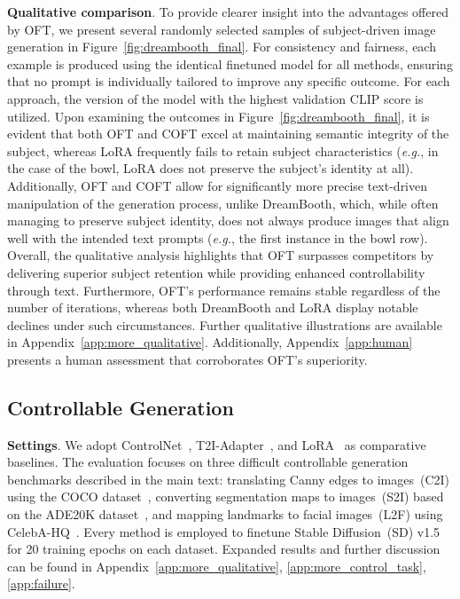 {\textbf{Qualitative comparison}. To provide clearer insight into the advantages offered by OFT, we present several randomly selected samples of subject-driven image generation in Figure~\ref{fig:dreambooth_final}. For consistency and fairness, each example is produced using the identical finetuned model for all methods, ensuring that no prompt is individually tailored to improve any specific outcome. For each approach, the version of the model with the highest validation CLIP score is utilized. Upon examining the outcomes in Figure~\ref{fig:dreambooth_final}, it is evident that both OFT and COFT excel at maintaining semantic integrity of the subject, whereas LoRA frequently fails to retain subject characteristics (\emph{e.g.}, in the case of the bowl, LoRA does not preserve the subject’s identity at all). Additionally, OFT and COFT allow for significantly more precise text-driven manipulation of the generation process, unlike DreamBooth, which, while often managing to preserve subject identity, does not always produce images that align well with the intended text prompts (\emph{e.g.}, the first instance in the bowl row). Overall, the qualitative analysis highlights that OFT surpasses competitors by delivering superior subject retention while providing enhanced controllability through text. Furthermore, OFT’s performance remains stable regardless of the number of iterations, whereas both DreamBooth and LoRA display notable declines under such circumstances. Further qualitative illustrations are available in Appendix~\ref{app:more_qualitative}. Additionally, Appendix~\ref{app:human} presents a human assessment that corroborates OFT’s superiority.

\subsection{Controllable Generation}

\textbf{Settings}. We adopt ControlNet~\cite{zhang2023adding}, T2I-Adapter~\cite{mou2023t2i}, and LoRA~\cite{hulora2022} as comparative baselines. The evaluation focuses on three difficult controllable generation benchmarks described in the main text: translating Canny edges to images~(C2I) using the COCO dataset~\cite{lin2014microsoft}, converting segmentation maps to images~(S2I) based on the ADE20K dataset~\cite{zhou2017scene}, and mapping landmarks to facial images~(L2F) using CelebA-HQ~\cite{karras2018progressive,xia2021tedigan}. Every method is employed to finetune Stable Diffusion~(SD) v1.5 for 20 training epochs on each dataset. Expanded results and further discussion can be found in Appendix~\ref{app:more_qualitative}, \ref{app:more_control_task}, \ref{app:failure}.

}
